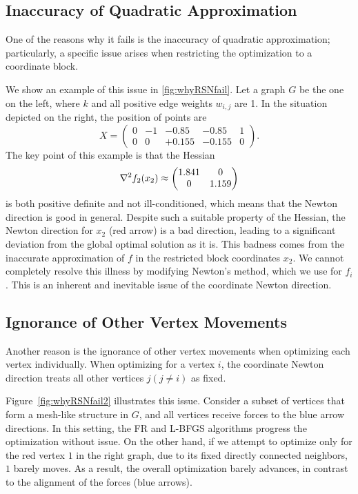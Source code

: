\documentclass[dvipdfmx,10pt,journal,compsoc]{IEEEtran}
\begin{document}
\subsection{Inaccuracy of Quadratic Approximation}\label{ssec:inaccuracy}

One of the reasons why it fails is the inaccuracy of quadratic approximation; particularly, a specific issue arises when restricting the optimization to a coordinate block.

We show an example of this issue in \cref{fig:whyRSNfail}.
Let a graph $G$ be the one on the left, where $k$ and all positive edge weights $w_{i,j}$ are 1.
In the situation depicted on the right, the position of points are
\begin{equation*}
  X = \begin{pmatrix}
    0 & -1 & -0.85  & -0.85  & 1 \\
    0 & 0  & +0.155 & -0.155 & 0
  \end{pmatrix}.
\end{equation*}
The key point of this example is that the Hessian
\begin{equation*}
  \nabla^2 f_2(x_2) \approx \mqty(1.841&0\\0&1.159)
\end{equation*}
is both positive definite and not ill-conditioned, which means that the Newton direction is good in general. Despite such a suitable property of the Hessian, the Newton direction for $x_2$ (red arrow) is a bad direction, leading to a significant deviation from the global optimal solution as it is. This badness comes from the inaccurate approximation of $f$ in the restricted block coordinates $x_2$.
We cannot completely resolve this illness by modifying Newton's method, which we use for $f_i$. This is an inherent and inevitable issue of the coordinate Newton direction.

\subsection{Ignorance of Other Vertex Movements}\label{ssec:ignorance}

Another reason is the ignorance of other vertex movements when optimizing each vertex individually.
When optimizing for a vertex $i$, the coordinate Newton direction treats all other vertices $j (j \neq i)$ as fixed.

Figure~\ref{fig:whyRSNfail2} illustrates this issue.
Consider a subset of vertices that form a mesh-like structure in $G$, and all vertices receive forces to the blue arrow directions.
In this setting, the FR and L-BFGS algorithms progress the optimization without issue.
On the other hand, if we attempt to optimize only for the red vertex $1$ in the right graph, due to its fixed directly connected neighbors, $1$ barely moves.
As a result, the overall optimization barely advances, in contrast to the alignment of the forces (blue arrows).
\end{document}
